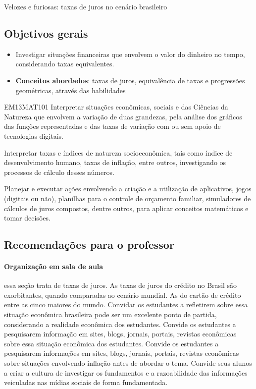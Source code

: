 \begin{paginatexto}{Velozes e furiosas: taxas de juros no cenário brasileiro}

\raggedcolumns
\subsection*{Objetivos gerais}

\begin{itemize}
\item Investigar situações financeiras que envolvem o valor do dinheiro no tempo, considerando taxas equivalentes.

\item \textbf{Conceitos abordados}: taxas de juros, equivalência de taxas e progressões geométricas, através das habilidades
\end{itemize}

\begin{habilities}{EM13MAT101}
 Interpretar situações econômicas, sociais e das Ciências da Natureza
que envolvem a variação de duas grandezas, pela análise dos gráficos das funções representadas e das taxas de variação com ou sem apoio de tecnologias digitais.


Interpretar taxas e índices de natureza socioeconômica, tais como índice de desenvolvimento humano, taxas de inflação, entre outros, investigando os processos de cálculo desses números.

Planejar e executar ações envolvendo a criação e a utilização de aplicativos, jogos (digitais ou não), planilhas para o controle de orçamento familiar, simuladores de cálculos de juros compostos, dentre outros, para aplicar conceitos matemáticos e tomar decisões. 

\end{habilities}

\subsection*{Recomendações para o professor}

\paragraph{Organização em sala de aula} essa seção trata de taxas de juros. As taxas de juros do crédito no Brasil são exorbitantes, quando comparadas ao cenário mundial. As do cartão de crédito entre as cinco maiores do mundo. Convidar os estudantes a refletirem sobre essa situação econômica brasileira pode ser um excelente ponto de partida, considerando a realidade econômica dos estudantes. Convide os estudantes a pesquisarem informação em sites, blogs, jornais, portais, revistas econômicas sobre essa situação econômica dos estudantes. Convide os estudantes a pesquisarem informações em sites, blogs, jornais, portais, revistas econômicas sobre situações envolvendo inflação antes de abordar o tema. Convide seus alunos a criar a cultura de investigar os fundamentos e a razoabilidade das informações veiculadas nas mídias sociais de forma fundamentada.


\end{paginatexto}
